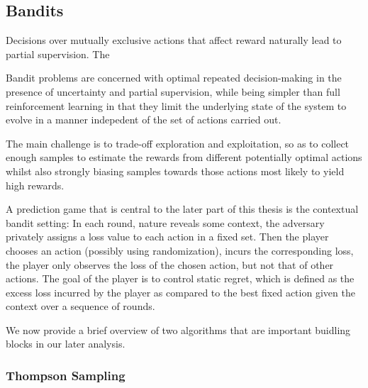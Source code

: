 
\subsection{Bandits}

Decisions over mutually exclusive actions that affect reward naturally lead to partial supervision.
The 

Bandit problems are concerned with optimal repeated decision-making in the presence of uncertainty and partial supervision, while being simpler than full reinforcement learning in that they limit the underlying state of the system to evolve in a manner indepedent of the set of actions carried out. 


The main challenge is to trade-off exploration and exploitation, so as to collect enough samples to estimate the rewards from different potentially optimal actions whilst also strongly biasing samples towards those actions most likely to yield high rewards.  

 A prediction game that is central to the later part of this thesis is the contextual bandit setting: In each round, nature reveals some context, the adversary privately assigns a loss value to each action in a fixed set.
 Then the player chooses an action (possibly using randomization), incurs the corresponding loss, the player only observes the loss of the chosen action, but not that of other actions.
 The goal of the player is to control static regret, which is defined as the excess loss incurred by the player as compared to the best fixed action given the context over a sequence of rounds.



We now provide a brief overview of two algorithms that are important buidling blocks in our later analysis. 

\subsubsection{Thompson Sampling}

